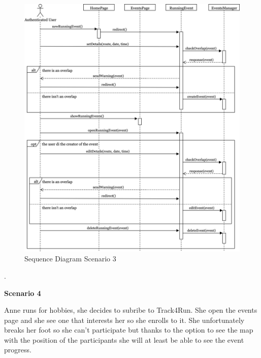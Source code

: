 \documentclass[../main.tex]{subfiles}
\begin{document}
		\begin{figure}[H]
			\centering
			\includegraphics[scale=.08]{images/sequenceDiagram3.png}
			\caption{Sequence Diagram Scenario 3 \label{fig:Sequence Diagram Scenario 3}}
		\end{figure}
		\begin{minipage}{\textwidth}
			 .
		\end{minipage}
		\begin{minipage}{\textwidth}
			{\bf Scenario 4}
			\vspace{3mm}

			Anne runs for hobbies, she decides to subribe to Track4Run. She open the events page and she see one that interests her so she enrolls to it. She unfortunately breaks her foot so she can't participate but thanks to the option to see the map with the position of the participants she will at least be able to see the event progress.
			\vspace{5mm}
		\end{minipage}
\end{document}
